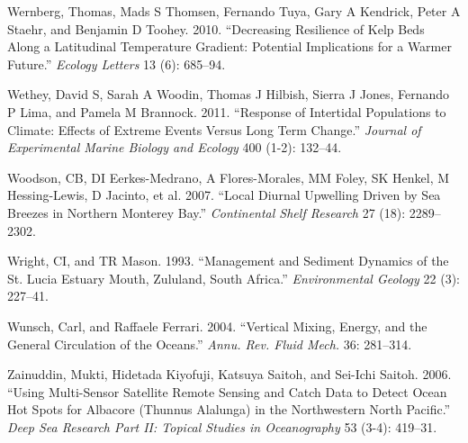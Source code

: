 \documentclass[10pt,a4paper,]{article}
\begin{document}
\leavevmode\hypertarget{ref-Wernberg2010}{}%
Wernberg, Thomas, Mads S Thomsen, Fernando Tuya, Gary A Kendrick, Peter
A Staehr, and Benjamin D Toohey. 2010. ``Decreasing Resilience of Kelp
Beds Along a Latitudinal Temperature Gradient: Potential Implications
for a Warmer Future.'' \emph{Ecology Letters} 13 (6): 685--94.

\leavevmode\hypertarget{ref-Wethey2011}{}%
Wethey, David S, Sarah A Woodin, Thomas J Hilbish, Sierra J Jones,
Fernando P Lima, and Pamela M Brannock. 2011. ``Response of Intertidal
Populations to Climate: Effects of Extreme Events Versus Long Term
Change.'' \emph{Journal of Experimental Marine Biology and Ecology} 400
(1-2): 132--44.

\leavevmode\hypertarget{ref-Woodson2007}{}%
Woodson, CB, DI Eerkes-Medrano, A Flores-Morales, MM Foley, SK Henkel, M
Hessing-Lewis, D Jacinto, et al. 2007. ``Local Diurnal Upwelling Driven
by Sea Breezes in Northern Monterey Bay.'' \emph{Continental Shelf
Research} 27 (18): 2289--2302.

\leavevmode\hypertarget{ref-Wright1993}{}%
Wright, CI, and TR Mason. 1993. ``Management and Sediment Dynamics of
the St. Lucia Estuary Mouth, Zululand, South Africa.''
\emph{Environmental Geology} 22 (3): 227--41.

\leavevmode\hypertarget{ref-Wunsch2004}{}%
Wunsch, Carl, and Raffaele Ferrari. 2004. ``Vertical Mixing, Energy, and
the General Circulation of the Oceans.'' \emph{Annu. Rev. Fluid Mech.}
36: 281--314.

\leavevmode\hypertarget{ref-Zainuddin2006}{}%
Zainuddin, Mukti, Hidetada Kiyofuji, Katsuya Saitoh, and Sei-Ichi
Saitoh. 2006. ``Using Multi-Sensor Satellite Remote Sensing and Catch
Data to Detect Ocean Hot Spots for Albacore (Thunnus Alalunga) in the
Northwestern North Pacific.'' \emph{Deep Sea Research Part II: Topical
Studies in Oceanography} 53 (3-4): 419--31.
\end{document}
